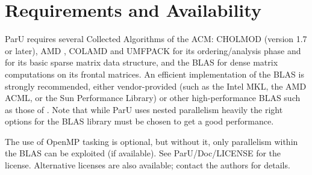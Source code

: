 \documentclass[12pt]{article}
\begin{document}
\section{Requirements and Availability}
\label{summary}

ParU requires several Collected Algorithms of the ACM: CHOLMOD
\cite{ChenDavisHagerRajamanickam09,DavisHager09} (version 1.7 or later), AMD
\cite{AmestoyDavisDuff96,AmestoyDavisDuff03}, COLAMD
\cite{DavisGilbertLarimoreNg00_algo,DavisGilbertLarimoreNg00} and UMFPACK 
\cite{10.1145/992200.992206} for its
ordering/analysis phase and for its basic sparse matrix data structure, and the
BLAS \cite{dddh:90} for dense matrix computations on its frontal matrices. 
An efficient implementation of the BLAS is strongly recommended, either
vendor-provided (such as the Intel MKL, the AMD ACML, or the 
Sun Performance Library) or other high-performance BLAS such as those of 
\cite{GotoVanDeGeijn08}. Note that while ParU uses nested parallelism heavily
the right options for the BLAS library must be chosen to get a good performance.

The use of OpenMP tasking is optional, but
without it, only parallelism within the BLAS can be exploited (if available).
See ParU/Doc/LICENSE for the license.
Alternative licenses are also
available; contact the authors for details.




\end{document}
